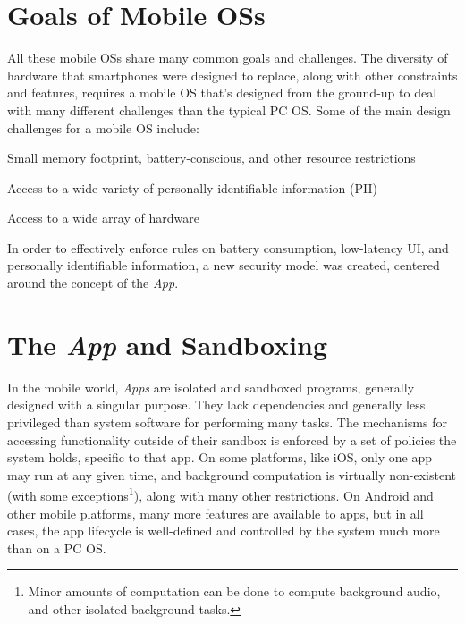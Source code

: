 \section{Goals of Mobile OSs}
All these mobile OSs share many common goals and challenges. The diversity of hardware that smartphones were designed to replace, along with other constraints and features, requires a mobile OS that's designed from the ground-up to deal with many different challenges than the typical PC OS. Some of the main design challenges for a mobile OS include: 
\begin{smitemize}

\item Small memory footprint, battery-conscious, and other resource restrictions

\item Access to a wide variety of personally identifiable information (PII)

\item Access to a wide array of hardware

\end{smitemize}
In order to effectively enforce rules on battery consumption, low-latency UI, and personally identifiable information, a new security model was created, centered around the concept of the \textit{App}. 



\section{The \textit{App} and Sandboxing}

In the mobile world, \textit{Apps} are isolated and sandboxed programs, generally designed with a singular purpose. They lack dependencies and generally less privileged than system software for performing many tasks. The mechanisms for accessing functionality outside of their sandbox is enforced by a set of policies the system holds, specific to that app. On some platforms, like iOS, only one app may run at any given time, and background computation is virtually non-existent (with some exceptions\footnote{Minor amounts of computation can be done to compute background audio, and other isolated background tasks.}), along with many other restrictions. On Android and other mobile platforms, many more features are available to apps, but in all cases, the app lifecycle is well-defined and controlled by the system much more than on a PC OS.

